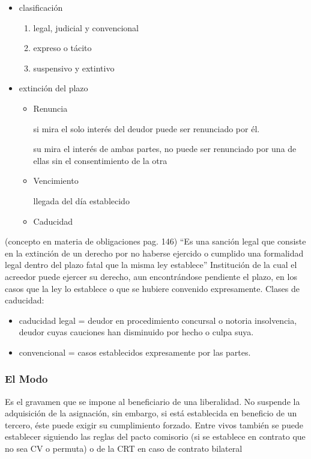 \documentclass[]{article}
\providecommand{\tightlist}{%
  \setlength{\itemsep}{0pt}\setlength{\parskip}{0pt}}
\begin{document}
\begin{itemize}
\tightlist
\item
  clasificación

  \begin{enumerate}
  \def\labelenumi{\arabic{enumi}.}
  \tightlist
  \item
    legal, judicial y convencional
  \item
    expreso o tácito
  \item
    suspensivo y extintivo
  \end{enumerate}
\item
  extinción del plazo

  \begin{itemize}
  \item
    Renuncia

    si mira el solo interés del deudor puede ser renunciado por él.

    su mira el interés de ambas partes, no puede ser renunciado por una
    de ellas sin el consentimiento de la otra
  \item
    Vencimiento

    llegada del día establecido
  \item
    Caducidad
  \end{itemize}
\end{itemize}

(concepto en materia de obligaciones pag. 146) ``Es una sanción legal
que consiste en la extinción de un derecho por no haberse ejercido o
cumplido una formalidad legal dentro del plazo fatal que la misma ley
establece'' Institución de la cual el acreedor puede ejercer su derecho,
aun encontrándose pendiente el plazo, en los casos que la ley lo
establece o que se hubiere convenido expresamente. Clases de caducidad:

\begin{itemize}
\item
  caducidad legal = deudor en procedimiento concursal o notoria
  insolvencia, deudor cuyas cauciones han disminuido por hecho o culpa
  suya.
\item
  convencional = casos establecidos expresamente por las partes.
\end{itemize}

\hypertarget{el-modo}{%
\subsubsection{El Modo}\label{el-modo}}

Es el gravamen que se impone al beneficiario de una liberalidad. No
suspende la adquisición de la asignación, sin embargo, si está
establecida en beneficio de un tercero, éste puede exigir su
cumplimiento forzado. Entre vivos también se puede establecer siguiendo
las reglas del pacto comisorio (si se establece en contrato que no sea
CV o permuta) o de la CRT en caso de contrato bilateral
\end{document}
